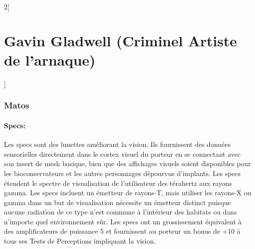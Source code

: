 \documentclass[a4paper,9pt]{article}
\begin{document}
\begin{multicols}{2}[\section*{Gavin Gladwell (Criminel Artiste de l'arnaque)}]
   \subsubsection*{Matos}

   \paragraph{Specs:} Les specs sont des lunettes améliorant la vision. Ils
   fournissent des données sensorielles directement dans le cortex visuel
   du porteur en se connectant avec son insert de mesh basique, bien que
   des affichages visuels soient disponibles pour les bioconservateurs et les
   autres personnages dépourvus d'implants. Les specs étendent le spectre de
   visualisation de l'utilisateur des térahertz aux rayons gamma. Les
   specs incluent un émetteur de rayons-T, mais utiliser les rayons-X ou
   gamma dans un but de visualisation nécessite un émetteur distinct puisque
   aucune radiation de ce type n'est commune à l'intérieur des habitats ou dans
   n'importe quel environnement sûr. Les specs ont un grossissement équivalent à
   des amplificateurs de puissance 5 et fournissent au porteur un bonus de +10 à
   tous ses Tests de Perceptions impliquant la vision.

\end{multicols}

\newpage
\end{document}
